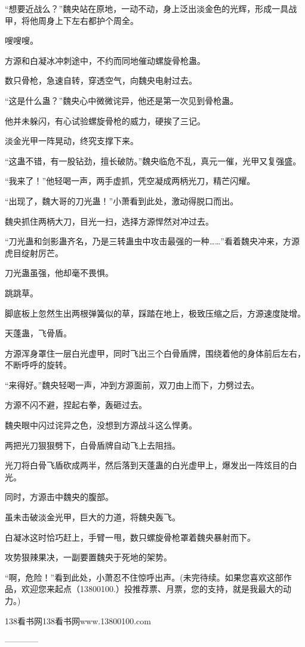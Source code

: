 \begin{this_body}
“想要近战么？”魏央站在原地，一动不动，身上泛出淡金色的光辉，形成一具战甲，将他周身上下左右都护个周全。

嗖嗖嗖。

方源和白凝冰冲刺途中，不约而同地催动螺旋骨枪蛊。

数只骨枪，急速自转，穿透空气，向魏央电射过去。

“这是什么蛊？”魏央心中微微诧异，他还是第一次见到骨枪蛊。

他并未躲闪，有心试验螺旋骨枪的威力，硬挨了三记。

淡金光甲一阵晃动，终究支撑下来。

“这蛊不错，有一股钻劲，擅长破防。”魏央临危不乱，真元一催，光甲又复强盛。

“我来了！”他轻喝一声，两手虚抓，凭空凝成两柄光刀，精芒闪耀。

“出现了，魏大哥的刀光蛊！”小萧看到此处，激动得脱口而出。

魏央抓住两柄大刀，目光一扫，选择方源悍然对冲过去。

“刀光蛊和剑影蛊齐名，乃是三转蛊虫中攻击最强的一种……”看着魏央冲来，方源虎目绽射厉芒。

刀光蛊虽强，他却毫不畏惧。

跳跳草。

脚底板上忽然生出两根弹簧似的草，踩踏在地上，极致压缩之后，方源速度陡增。

天蓬蛊，飞骨盾。

方源浑身罩住一层白光虚甲，同时飞出三个白骨盾牌，围绕着他的身体前后左右，不断呼呼的旋转。

“来得好。”魏央轻喝一声，冲到方源面前，双刀由上而下，力劈过去。

方源不闪不避，捏起右拳，轰砸过去。

魏央眼中闪过诧异之色，没想到方源战斗这么悍勇。

两把光刀狠狠劈下，白骨盾牌自动飞上去阻挡。

光刀将白骨飞盾砍成两半，然后落到天蓬蛊的白光虚甲上，爆发出一阵炫目的白光。

同时，方源击中魏央的腹部。

虽未击破淡金光甲，巨大的力道，将魏央轰飞。

白凝冰这时恰巧赶上，手臂一甩，数只螺旋骨枪罩着魏央暴射而下。

攻势狠辣果决，一副要置魏央于死地的架势。

“啊，危险！”看到此处，小萧忍不住惊呼出声。(未完待续。如果您喜欢这部作品，欢迎您来起点（13800100.）投推荐票、月票，您的支持，就是我最大的动力。)

138看书网138看书网www.13800100.com

------------

\end{this_body}

